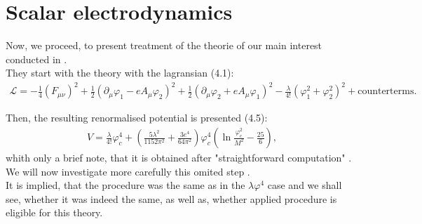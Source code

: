 \section{Scalar electrodynamics}
Now, we proceed, to present treatment of the theorie of our main interest conducted in 
\cite{Coleman1973}. \\
They start with the theory with the lagransian \cite{Coleman1973}(4.1):
\begin{align}\label{CW_electrodynamics}
\mathcal{L} = -\frac{1}{4}(F_{\mu\nu})^2+\frac{1}{2}(\partial_\mu\varphi_1-eA_\mu\varphi_2)^2 + 
\frac{1}{2}(\partial_\mu\varphi_2+eA_\mu\varphi_1)^2-\frac{\lambda}{4!}(\varphi_1^2+\varphi_2^2)^2 
 + \textrm{counterterms}.
\end{align}

Then, the resulting renormalised potential is presented \cite{Coleman1973}(4.5):
\begin{align}
V = \frac{\lambda}{4!}\varphi_c^4+\left(\frac{5\lambda^2}{1152\pi^2}+\frac{3e^4}{64\pi^2}\right)
\varphi_c^4\left(\ln\frac{\varphi_c^2}{M^2}-\frac{25}{6}\right),
\end{align}
whith only a brief note, that it is obtained after "straightforward computation" 
.\\
We will now investigate more carefully this omited step
.\\
It is implied, that the procedure was the same as in the $\lambda\varphi^4$ case and we shall see, 
whether it was indeed the same, as well as, whether applied procedure is eligible for this theory.\\

